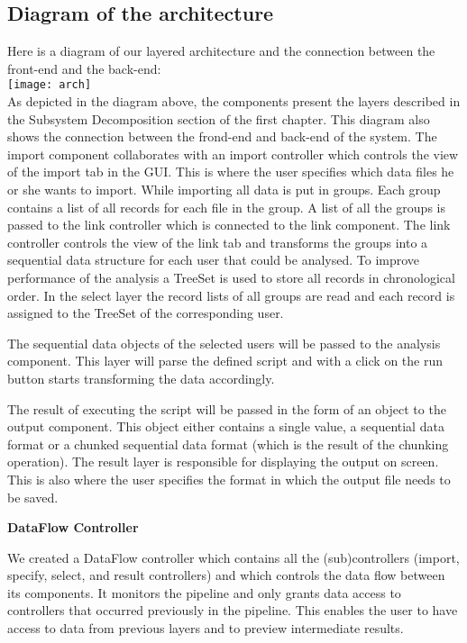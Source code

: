 \documentclass[a4paper,english,fleqn]{exam}
\begin{document}
\newpage

\subsection{Diagram of the architecture}

Here is a diagram of our layered architecture and the connection between the front-end and the back-end: \\

\texttt{[image: arch]} \\

As depicted in the diagram above, the components present the layers described in the Subsystem Decomposition section of the first chapter. This diagram also shows the connection between the frond-end and back-end of the system. The import component collaborates with an import controller which controls the view of the import tab in the GUI. This is where the user specifies which data files he or she wants to import. While importing all data is put in groups. Each group contains a list of all records for each file in the group. A list of all the groups is passed to the link controller which is connected to the link component. The link controller controls the view of the link tab and transforms the groups into a sequential data structure for each user that could be analysed. To improve performance of the analysis a TreeSet is used to store all records in chronological order. In the select layer the record lists of all groups are read and each record is assigned to the TreeSet of the corresponding user. 
 
The sequential data objects of the selected users will be passed to the analysis component. This layer will parse the defined script and with a click on the run button starts transforming the data accordingly. 

The result of executing the script will be passed in the form of an object to the output component. This object either contains a single value, a sequential data format or a chunked sequential data format (which is the result of the chunking operation). The result layer is responsible for displaying the output on screen. This is also where the user specifies the format in which the output file needs to be saved.

 
\textbf{DataFlow Controller} 

We created a DataFlow controller which contains all the (sub)controllers (import, specify, select, and result controllers) and which controls the data flow between its components. It monitors the pipeline and only grants data access to controllers that occurred previously in the pipeline. This enables the user to have access to data from previous layers and to preview intermediate results.
 
\end{document}
